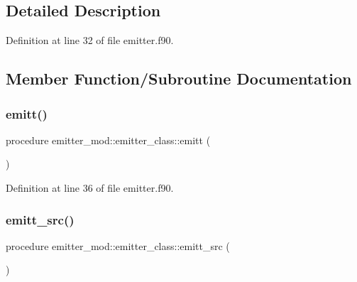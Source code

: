 \subsection{Detailed Description}


Definition at line 32 of file emitter.\+f90.



\subsection{Member Function/\+Subroutine Documentation}
\mbox{\label{structemitter__mod_1_1emitter__class_ac33721448c01508a8e8c486cd7a76b65}} 
\subsubsection{\texorpdfstring{emitt()}{emitt()}}
{\footnotesize\ttfamily procedure emitter\+\_\+mod\+::emitter\+\_\+class\+::emitt (\begin{DoxyParamCaption}{ }\end{DoxyParamCaption})\hspace{0.3cm}{\ttfamily [private]}}



Definition at line 36 of file emitter.\+f90.

\mbox{\label{structemitter__mod_1_1emitter__class_add0931d8dbc76013de6ca81660639835}} 
\subsubsection{\texorpdfstring{emitt\+\_\+src()}{emitt\_src()}}
{\footnotesize\ttfamily procedure emitter\+\_\+mod\+::emitter\+\_\+class\+::emitt\+\_\+src (\begin{DoxyParamCaption}{ }\end{DoxyParamCaption})\hspace{0.3cm}{\ttfamily [private]}}



